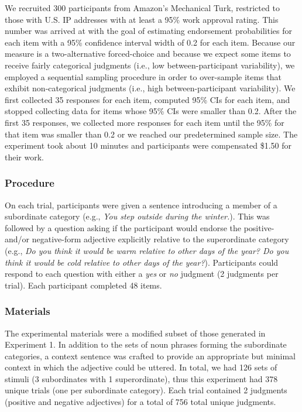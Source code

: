 \documentclass[doc]{apa6}
\begin{document}
We recruited 300 participants from Amazon's Mechanical Turk, restricted to those with U.S. IP addresses with at least a 95\% work approval rating. 
This number was arrived at with the goal of estimating endorsement probabilities for each item with a 95\% confidence interval width of 0.2 for each item. 
Because our measure is a two-alternative forced-choice and because we expect some items to receive fairly categorical judgments (i.e., low between-participant variability), we employed a sequential sampling procedure in order to over-sample items that exhibit non-categorical judgments (i.e., high between-participant variability). 
We first collected 35 responses for each item, computed 95\% CIs for each item, and stopped collecting data for items whose 95\% CIs were smaller than 0.2.
After the first 35 responses, we collected more responses for each item until the 95\% for that item was smaller than 0.2 or we reached our predetermined sample size. 
The experiment took about 10 minutes and participants were compensated \$1.50 for their work.

\subsubsection{Procedure}

On each trial, participants were given a sentence introducing a member of a subordinate category (e.g., \emph{You step outside during the winter.}). 
This was followed by a question asking if the participant would endorse the positive- and/or negative-form adjective explicitly relative to the superordinate category (e.g., \emph{Do you think it would be warm relative to other days of the year? Do you think it would be cold relative to other days of the year?}).
Participants could respond to each question with either a \emph{yes} or \emph{no} judgment (2 judgments per trial).
Each participant completed 48 items. 

\subsubsection{Materials}

The experimental materials were a modified subset of those generated in Experiment 1. 
In addition to the sets of noun phrases forming the subordinate categories, a context sentence was crafted to provide an appropriate but minimal context in which the adjective could be uttered. 
In total, we had 126 sets of stimuli (3 subordinates with 1 superordinate), thus this experiment had 378 unique trials (one per subordinate category). 
Each trial contained 2 judgments (positive and negative adjectives) for a total of 756 total unique judgments.
\end{document}
